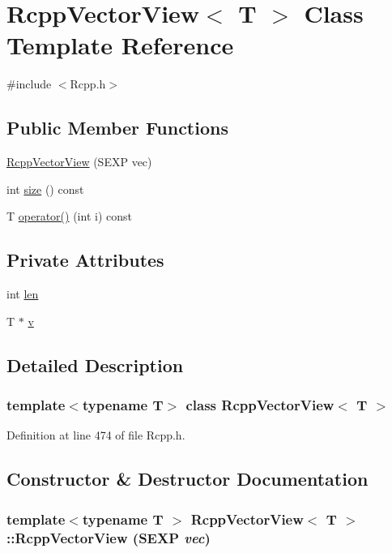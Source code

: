 \hypertarget{classRcppVectorView}{
\section{RcppVectorView$<$ T $>$ Class Template Reference}
\label{classRcppVectorView}
}


{\ttfamily \#include $<$Rcpp.h$>$}\subsection*{Public Member Functions}
\begin{DoxyCompactItemize}
\item 
\hyperlink{classRcppVectorView_ad2e90fed8ee8a40f56591cc94f83041e}{RcppVectorView} (SEXP vec)
\item 
int \hyperlink{classRcppVectorView_ad4c0f21296eb1cf7b2e2c8b8b43f4b0d}{size} () const 
\item 
T \hyperlink{classRcppVectorView_a13d63e990363a37ae29e0eab7400d297}{operator()} (int i) const 
\end{DoxyCompactItemize}
\subsection*{Private Attributes}
\begin{DoxyCompactItemize}
\item 
int \hyperlink{classRcppVectorView_ada67f9b1481099e4a820deaf4648778b}{len}
\item 
T $\ast$ \hyperlink{classRcppVectorView_ae3dc3546d0dd0e3de95800b7c91857e8}{v}
\end{DoxyCompactItemize}


\subsection{Detailed Description}
\subsubsection*{template$<$typename T$>$ class RcppVectorView$<$ T $>$}



Definition at line 474 of file Rcpp.h.

\subsection{Constructor \& Destructor Documentation}
\hypertarget{classRcppVectorView_ad2e90fed8ee8a40f56591cc94f83041e}{
\subsubsection[{RcppVectorView}]{\setlength{\rightskip}{0pt plus 5cm}template$<$typename T $>$ {\bf RcppVectorView}$<$ T $>$::{\bf RcppVectorView} (SEXP {\em vec})}}
\label{classRcppVectorView_ad2e90fed8ee8a40f56591cc94f83041e}


